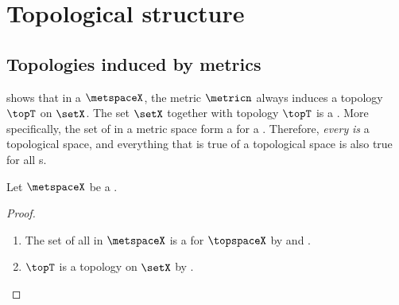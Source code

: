 \section{Topological structure}
\subsection{Topologies induced by metrics}
\label{sec:topmetric}
 shows that in a   $\metspaceX$,
the metric $\metricn$ always induces a topology $\topT$ on $\setX$.
The set $\setX$ together with  topology $\topT$ is a .
More specifically, the set of  in a metric space form a  for a .
Therefore, {\em every}   {\em is} a topological space,
and everything that is true of a topological space is also true for all s.

\begin{theorem}
\label{thm:(X,d)->(X,t)}
Let $\metspaceX$ be a  .
\end{theorem}
\begin{proof}
\begin{enumerate}
  \item The set of all  in $\metspaceX$ is a  for $\topspaceX$ by 
         and .
        
  \item $\topT$ is a topology on $\setX$ by .
\end{enumerate}
\end{proof}

